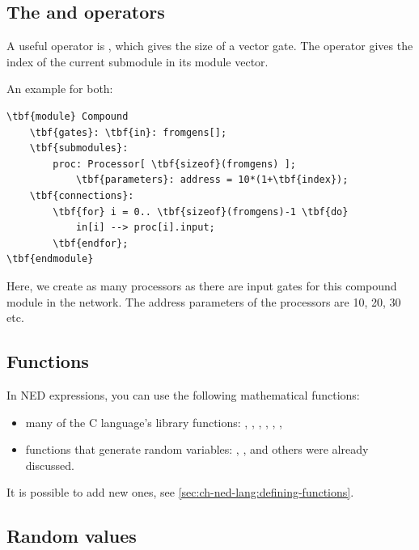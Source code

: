 \subsection{The  and  operators}

A useful operator is , which gives the
size of a vector gate. The 
operator gives the index of the current
submodule in its module vector.

An example for both:

\begin{Verbatim}[commandchars=\\\{\}]
\tbf{module} Compound
    \tbf{gates}: \tbf{in}: fromgens[];
    \tbf{submodules}:
        proc: Processor[ \tbf{sizeof}(fromgens) ];
            \tbf{parameters}: address = 10*(1+\tbf{index});
    \tbf{connections}:
        \tbf{for} i = 0.. \tbf{sizeof}(fromgens)-1 \tbf{do}
            in[i] --> proc[i].input;
        \tbf{endfor};
\tbf{endmodule}
\end{Verbatim}


Here, we create as many processors as there are input gates for
this compound module in the network. The address parameters of
the processors are 10, 20, 30 etc.




\subsection{Functions}

In NED expressions, you can use the following mathematical functions:
\begin{itemize}
  \item{many of the C language's  library functions:
    , , , , ,
    , }
  \item{functions that generate random variables: ,
    ,  and others were already
    discussed.}
\end{itemize}

It is possible to add new ones, see \ref{sec:ch-ned-lang:defining-functions}.

\subsection{Random values}

